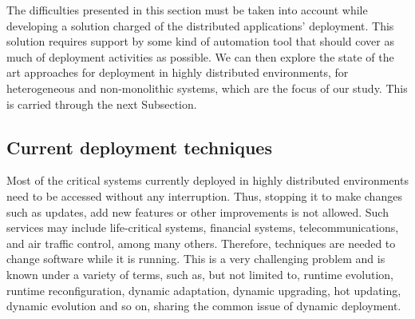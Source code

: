 The difficulties presented in this section must be taken into account while developing a solution charged of the distributed applications' deployment.
This solution requires support by some kind of automation tool that should cover as much of deployment activities as possible.
We can then explore the state of the art approaches for deployment in highly distributed environments, for heterogeneous and non-monolithic systems, which are the focus of our study.
This is carried through the next Subsection.

\subsection{Current deployment techniques}
\label{sec:dynamicDeploymentDAS}
Most of the critical systems currently deployed in highly distributed environments need to be accessed without any interruption.
Thus, stopping it to make changes such as updates, add new features or other improvements is not allowed.
Such services may include life-critical systems, financial systems, telecommunications, and air traffic control, among many others.
Therefore, techniques are needed to change software while it is running. 
This is a very challenging problem and is known under a variety of terms, such as, but not limited to, runtime evolution, runtime reconfiguration, dynamic adaptation, dynamic upgrading, hot updating, dynamic evolution and so on, sharing the common issue of dynamic deployment.

